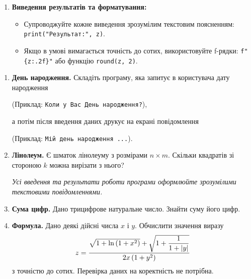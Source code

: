 \begin{enumerate}[label=\arabic*.]
\begin{itemize}
		\item Число $\pi$: константа \texttt{math.pi}.
		\item Модуль числа $|x|$: вбудована функція \texttt{abs(x)} або \texttt{math.fabs(x)}.
	\end{itemize}
	\item \textbf{Виведення результатів та форматування:}
	\begin{itemize}
		\item Супроводжуйте кожне виведення зрозумілим текстовим поясненням: \texttt{print("Результат:", z)}.
		\item Якщо в умові вимагається точність до сотих, використовуйте f-рядки: \texttt{f"\{z:.2f\}"} або функцію \texttt{round(z, 2)}.
	\end{itemize}
\end{enumerate}
\bigskip



\begin{enumerate}
\item \textbf{День народження.} Складіть програму, яка запитує в користувача дату народження

(Приклад: \verb|Коли у Вас День народження?|),

а потім після введення даних друкує на екрані повідомлення

(Приклад: \verb|Мій день народження ...|).

\item \textbf{Лінолеум.} Є шматок лінолеуму з розмірами $n \times m$. Скільки квадратів зі стороною $k$ можна вирізати з нього?

{\itshape Усі введення та результати роботи програми оформлюйте зрозумілими текстовими повідомленнями.}

\item \textbf{Сума цифр.} Дано трицифрове натуральне число. Знайти суму його цифр.

\item \textbf{Формула.} Дано деякі дійсні числа $x$ і $y$. Обчислити значення виразу
$$
z=\dfrac{\sqrt{\mathstrut 1+\ln \left(1+x^2\right)}+\sqrt{\mathstrut 1+\dfrac{1}{1+|y|}}}{2x\,(1+y^2)}
$$
з точністю до сотих. Перевірка даних на коректність не потрібна.
\end{enumerate}





